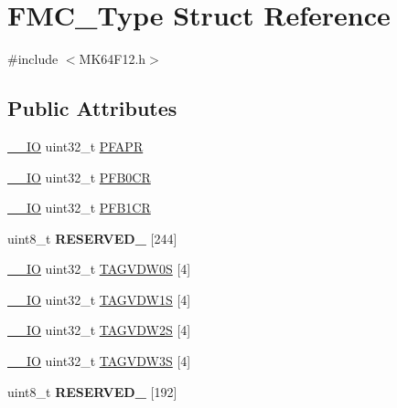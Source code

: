 \hypertarget{structFMC__Type}{}\section{F\+M\+C\+\_\+\+Type Struct Reference}
\label{structFMC__Type}


{\ttfamily \#include $<$M\+K64\+F12.\+h$>$}

\subsection*{Public Attributes}
\begin{DoxyCompactItemize}
\item 
\hyperlink{core__sc300_8h_aec43007d9998a0a0e01faede4133d6be}{\+\_\+\+\_\+\+IO} uint32\+\_\+t \hyperlink{structFMC__Type_ab9738b2970c2c6c4a0c5948b181154f8}{P\+F\+A\+PR}
\item 
\hyperlink{core__sc300_8h_aec43007d9998a0a0e01faede4133d6be}{\+\_\+\+\_\+\+IO} uint32\+\_\+t \hyperlink{structFMC__Type_addc2732843e4b2b25a50de98f9db47ab}{P\+F\+B0\+CR}
\item 
\hyperlink{core__sc300_8h_aec43007d9998a0a0e01faede4133d6be}{\+\_\+\+\_\+\+IO} uint32\+\_\+t \hyperlink{structFMC__Type_afa824c39043a1b8cc1c25fe55f72a389}{P\+F\+B1\+CR}
\item 
uint8\+\_\+t {\bfseries R\+E\+S\+E\+R\+V\+E\+D\+\_} \mbox{[}244\mbox{]}\hypertarget{structFMC__Type_a9a8abebbae7504d2edca9303844ee449}{}\label{structFMC__Type_a9a8abebbae7504d2edca9303844ee449}

\item 
\hyperlink{core__sc300_8h_aec43007d9998a0a0e01faede4133d6be}{\+\_\+\+\_\+\+IO} uint32\+\_\+t \hyperlink{structFMC__Type_af4beec71c02cec273f84037100e4010d}{T\+A\+G\+V\+D\+W0S} \mbox{[}4\mbox{]}
\item 
\hyperlink{core__sc300_8h_aec43007d9998a0a0e01faede4133d6be}{\+\_\+\+\_\+\+IO} uint32\+\_\+t \hyperlink{structFMC__Type_a277463c2ce24b62837ed2ed1607d6873}{T\+A\+G\+V\+D\+W1S} \mbox{[}4\mbox{]}
\item 
\hyperlink{core__sc300_8h_aec43007d9998a0a0e01faede4133d6be}{\+\_\+\+\_\+\+IO} uint32\+\_\+t \hyperlink{structFMC__Type_a29d5155ea94fa1b158e561c465caba8b}{T\+A\+G\+V\+D\+W2S} \mbox{[}4\mbox{]}
\item 
\hyperlink{core__sc300_8h_aec43007d9998a0a0e01faede4133d6be}{\+\_\+\+\_\+\+IO} uint32\+\_\+t \hyperlink{structFMC__Type_a4f0f05ff2513a816f144035f95408246}{T\+A\+G\+V\+D\+W3S} \mbox{[}4\mbox{]}
\item 
uint8\+\_\+t {\bfseries R\+E\+S\+E\+R\+V\+E\+D\+\_} \mbox{[}192\mbox{]}\hypertarget{structFMC__Type_a7bbbad57328c8eaf7c7a3879b3fa4c9c}{}\label{structFMC__Type_a7bbbad57328c8eaf7c7a3879b3fa4c9c}


\end{DoxyCompactItemize}
